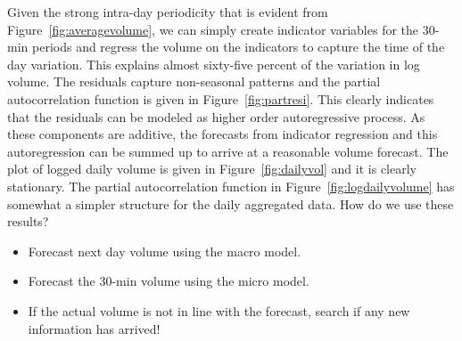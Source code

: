 Given the strong intra-day periodicity that is evident from Figure~\ref{fig:averagevolume}, we can simply create indicator variables for the 30-min periods and regress the volume on the indicators to capture the time of the day variation. This explains almost sixty-five percent of the variation in log volume. The residuals capture non-seasonal patterns and the partial autocorrelation function is given in Figure~\ref{fig:partresi}. This clearly indicates that the residuals can be modeled as higher order autoregressive process. As these components are additive, the forecasts from indicator regression and this autoregression can be summed up to arrive at a reasonable volume forecast. The plot of logged daily volume is given in Figure~\ref{fig:dailyvol} and it is clearly stationary. The partial autocorrelation function in Figure~\ref{fig:logdailyvolume} has somewhat a simpler structure for the daily aggregated data. How do we use these results?
	\begin{itemize}
	\item Forecast next day volume using the macro model.
	\item Forecast the 30-min volume using the micro model.
	\item If the actual volume is not in line with the forecast, search if any new information has arrived!
	\end{itemize}
	
